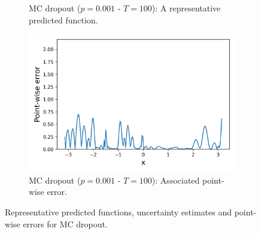 \begin{figure}[H]
\begin{subfigure}{.45\textwidth}
		\caption{MC dropout ($p = 0.001$ - $T=100$): A representative predicted function.}
	\end{subfigure}
	\hspace{1cm}
	\begin{subfigure}{.45\textwidth}
		\centering
		\includegraphics[width=1\linewidth]{./figs/mcdrop_001_err.png}  
		\caption{MC dropout ($p = 0.001$ - $T=100$): Associated point-wise error.}
	\end{subfigure}
	\caption{Representative predicted functions, uncertainty estimates and point-wise errors for MC dropout.}
\end{figure}

